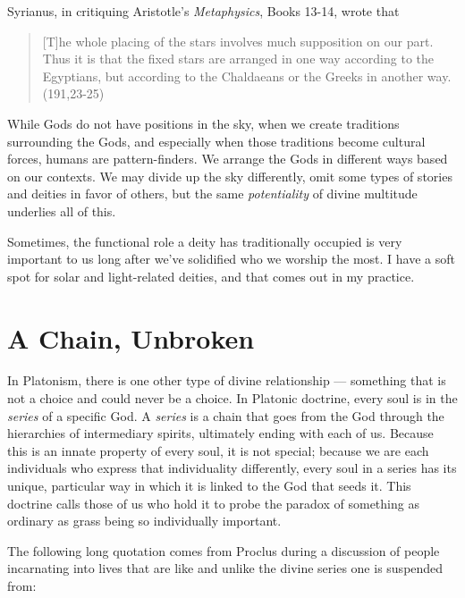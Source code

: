 \documentclass[
]{book}
\begin{document}
Syrianus, in critiquing Aristotle's \emph{Metaphysics}, Books 13-14, wrote that

\begin{quote}
{[}T{]}he whole placing of the stars involves much supposition on our part. Thus it is that the fixed stars are arranged in one way according to the Egyptians, but according to the Chaldaeans or the Greeks in another way.
(191,23-25)
\end{quote}

While Gods do not have positions in the sky, when we create traditions surrounding the Gods, and especially when those traditions become cultural forces, humans are pattern-finders. We arrange the Gods in different ways based on our contexts. We may divide up the sky differently, omit some types of stories and deities in favor of others, but the same \emph{potentiality} of divine multitude underlies all of this.

Sometimes, the functional role a deity has traditionally occupied is very important to us long after we've solidified who we worship the most. I have a soft spot for solar and light-related deities, and that comes out in my practice.

\hypertarget{a-chain-unbroken}{%
\section{A Chain, Unbroken}\label{a-chain-unbroken}}

In Platonism, there is one other type of divine relationship --- something that is not a choice and could never be a choice. In Platonic doctrine, every soul is in the \emph{series} of a specific God. A \emph{series} is a chain that goes from the God through the hierarchies of intermediary spirits, ultimately ending with each of us. Because this is an innate property of every soul, it is not special; because we are each individuals who express that individuality differently, every soul in a series has its unique, particular way in which it is linked to the God that seeds it. This doctrine calls those of us who hold it to probe the paradox of something as ordinary as grass being so individually important.

The following long quotation comes from Proclus during a discussion of people incarnating into lives that are like and unlike the divine series one is suspended from:
\end{document}
